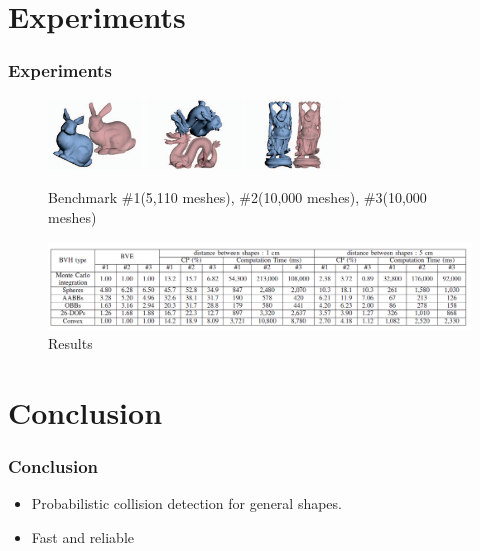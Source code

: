 \documentclass{beamer}
\begin{document}
\section{Experiments}
\begin{frame}
	\frametitle{Experiments}
	\begin{figure}	
		\includegraphics[width=2.5cm]{imgs/Benchmark1.png}
		\includegraphics[width=2.5cm]{imgs/Benchmark2.png}
		\includegraphics[width=2.5cm]{imgs/Benchmark3.png}
		\caption{Benchmark \#1(5,110 meshes), \#2(10,000 meshes), \#3(10,000 meshes)}
	\end{figure}
	\begin{figure}	
		\includegraphics[width=12cm]{imgs/Table.png}
		\caption{Results}
	\end{figure}
\end{frame}



\section{Conclusion}

\begin{frame}
	\frametitle{Conclusion}
	\begin{itemize}
		\item Probabilistic collision detection for general shapes.
		\item Fast and reliable
	\end{itemize}
\end{frame}

\end{document}

